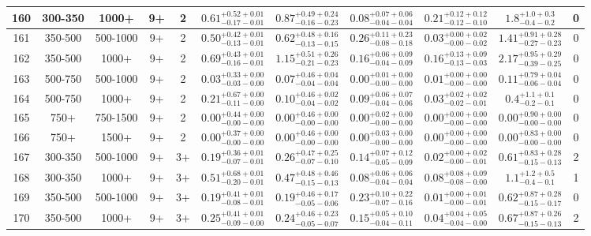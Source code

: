 \documentclass[11pt, oneside]{article}
\begin{document}
\begin{table}
{\begin{tabular}{ |c|c|c|c|c||c|c|c|c||c|c| }
160 & 300-350 & 1000+ & 9+ & 2 & $0.61^{+0.52+0.01}_{-0.17-0.01}$ & $0.87^{+0.49+0.24}_{-0.16-0.23}$ & $0.08^{+0.07+0.06}_{-0.04-0.04}$ & $0.21^{+0.12+0.12}_{-0.12-0.10}$ & $1.8^{+1.0+0.3}_{-0.4-0.2}$ & 0 \\ \hline
161 & 350-500 & 500-1000 & 9+ & 2 & $0.50^{+0.42+0.01}_{-0.13-0.01}$ & $0.62^{+0.48+0.16}_{-0.13-0.15}$ & $0.26^{+0.11+0.23}_{-0.08-0.18}$ & $0.03^{+0.00+0.02}_{-0.00-0.02}$ & $1.41^{+0.91+0.28}_{-0.27-0.23}$ & 0 \\ \hline
162 & 350-500 & 1000+ & 9+ & 2 & $0.69^{+0.43+0.01}_{-0.16-0.01}$ & $1.15^{+0.51+0.26}_{-0.21-0.23}$ & $0.16^{+0.06+0.09}_{-0.04-0.09}$ & $0.16^{+0.13+0.09}_{-0.13-0.03}$ & $2.17^{+0.95+0.29}_{-0.39-0.25}$ & 0 \\ \hline
163 & 500-750 & 500-1000 & 9+ & 2 & $0.03^{+0.33+0.00}_{-0.03-0.00}$ & $0.07^{+0.46+0.04}_{-0.04-0.04}$ & $0.00^{+0.01+0.00}_{-0.00-0.00}$ & $0.01^{+0.00+0.00}_{-0.00-0.00}$ & $0.11^{+0.79+0.04}_{-0.06-0.04}$ & 0 \\ \hline
164 & 500-750 & 1000+ & 9+ & 2 & $0.21^{+0.67+0.00}_{-0.11-0.00}$ & $0.10^{+0.46+0.02}_{-0.04-0.02}$ & $0.09^{+0.06+0.07}_{-0.04-0.06}$ & $0.03^{+0.02+0.02}_{-0.02-0.01}$ & $0.4^{+1.1+0.1}_{-0.2-0.1}$ & 0 \\ \hline
165 & 750+ & 750-1500 & 9+ & 2 & $0.00^{+0.44+0.00}_{-0.00-0.00}$ & $0.00^{+0.46+0.00}_{-0.00-0.00}$ & $0.00^{+0.02+0.00}_{-0.00-0.00}$ & $0.00^{+0.00+0.00}_{-0.00-0.00}$ & $0.00^{+0.90+0.00}_{-0.00-0.00}$ & 0 \\ \hline
166 & 750+ & 1500+ & 9+ & 2 & $0.00^{+0.37+0.00}_{-0.00-0.00}$ & $0.00^{+0.46+0.00}_{-0.00-0.00}$ & $0.00^{+0.03+0.00}_{-0.00-0.00}$ & $0.00^{+0.00+0.00}_{-0.00-0.00}$ & $0.00^{+0.83+0.00}_{-0.00-0.00}$ & 0 \\ \hline
167 & 300-350 & 500-1000 & 9+ & 3+ & $0.19^{+0.36+0.01}_{-0.07-0.01}$ & $0.26^{+0.47+0.25}_{-0.07-0.10}$ & $0.14^{+0.07+0.12}_{-0.05-0.09}$ & $0.02^{+0.00+0.02}_{-0.00-0.01}$ & $0.61^{+0.83+0.28}_{-0.15-0.13}$ & 2 \\ \hline
168 & 300-350 & 1000+ & 9+ & 3+ & $0.51^{+0.68+0.01}_{-0.20-0.01}$ & $0.47^{+0.48+0.46}_{-0.15-0.13}$ & $0.08^{+0.06+0.06}_{-0.04-0.04}$ & $0.08^{+0.08+0.09}_{-0.08-0.00}$ & $1.1^{+1.2+0.5}_{-0.4-0.1}$ & 1 \\ \hline
169 & 350-500 & 500-1000 & 9+ & 3+ & $0.19^{+0.41+0.01}_{-0.08-0.01}$ & $0.19^{+0.46+0.17}_{-0.05-0.06}$ & $0.23^{+0.10+0.22}_{-0.07-0.16}$ & $0.01^{+0.00+0.01}_{-0.00-0.01}$ & $0.62^{+0.87+0.28}_{-0.15-0.17}$ & 0 \\ \hline
170 & 350-500 & 1000+ & 9+ & 3+ & $0.25^{+0.41+0.01}_{-0.09-0.00}$ & $0.24^{+0.46+0.23}_{-0.05-0.07}$ & $0.15^{+0.05+0.10}_{-0.04-0.11}$ & $0.04^{+0.04+0.05}_{-0.04-0.00}$ & $0.67^{+0.87+0.26}_{-0.15-0.13}$ & 2 \\ \hline

\end{tabular}}
\end{table}
\end{document}
